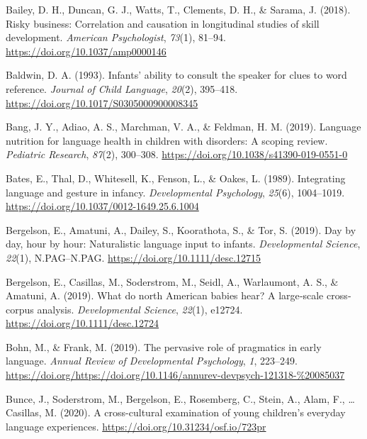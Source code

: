 \documentclass[
  english,
  man,floatsintext]{apa6}
\begin{document}
\leavevmode\hypertarget{ref-bailey_risky_2018}{}%
Bailey, D. H., Duncan, G. J., Watts, T., Clements, D. H., \& Sarama, J. (2018). Risky business: Correlation and causation in longitudinal studies of skill development. \emph{American Psychologist}, \emph{73}(1), 81--94. \url{https://doi.org/10.1037/amp0000146}

\leavevmode\hypertarget{ref-baldwin_infants_1993}{}%
Baldwin, D. A. (1993). Infants' ability to consult the speaker for clues to word reference. \emph{Journal of Child Language}, \emph{20}(2), 395--418. \url{https://doi.org/10.1017/S0305000900008345}

\leavevmode\hypertarget{ref-bang_language_2019}{}%
Bang, J. Y., Adiao, A. S., Marchman, V. A., \& Feldman, H. M. (2019). Language nutrition for language health in children with disorders: A scoping review. \emph{Pediatric Research}, \emph{87}(2), 300--308. \url{https://doi.org/10.1038/s41390-019-0551-0}

\leavevmode\hypertarget{ref-bates_integrating_1989}{}%
Bates, E., Thal, D., Whitesell, K., Fenson, L., \& Oakes, L. (1989). Integrating language and gesture in infancy. \emph{Developmental Psychology}, \emph{25}(6), 1004--1019. \url{https://doi.org/10.1037/0012-1649.25.6.1004}

\leavevmode\hypertarget{ref-bergelson_day_2019}{}%
Bergelson, E., Amatuni, A., Dailey, S., Koorathota, S., \& Tor, S. (2019). Day by day, hour by hour: Naturalistic language input to infants. \emph{Developmental Science}, \emph{22}(1), N.PAG--N.PAG. \url{https://doi.org/10.1111/desc.12715}

\leavevmode\hypertarget{ref-bergelson_what_2019}{}%
Bergelson, E., Casillas, M., Soderstrom, M., Seidl, A., Warlaumont, A. S., \& Amatuni, A. (2019). What do north American babies hear? A large‐scale cross‐corpus analysis. \emph{Developmental Science}, \emph{22}(1), e12724. \url{https://doi.org/10.1111/desc.12724}

\leavevmode\hypertarget{ref-bohn_pervasive_2019}{}%
Bohn, M., \& Frank, M. (2019). The pervasive role of pragmatics in early language. \emph{Annual Review of Developmental Psychology}, \emph{1}, 223--249. \url{https://doi.org/https://doi.org/10.1146/annurev-devpsych-121318-\%20085037}

\leavevmode\hypertarget{ref-bunce_cross-cultural_2020}{}%
Bunce, J., Soderstrom, M., Bergelson, E., Rosemberg, C., Stein, A., Alam, F., \ldots{} Casillas, M. (2020). A cross-cultural examination of young children's everyday language experiences. \url{https://doi.org/10.31234/osf.io/723pr}
\end{document}

